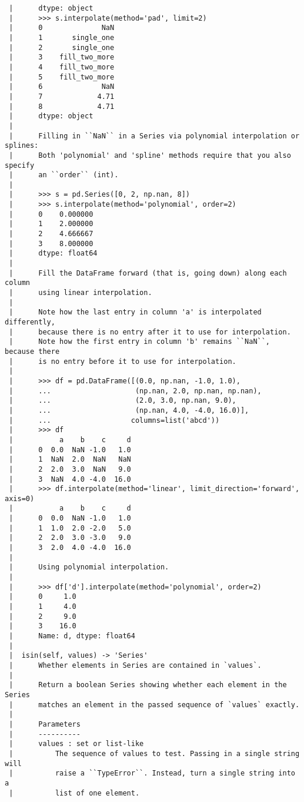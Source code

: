 \documentclass[
  letterpaper,
  DIV=11,
  numbers=noendperiod]{scrreprt}
\begin{document}
\begin{verbatim}
 |      dtype: object
 |      >>> s.interpolate(method='pad', limit=2)
 |      0              NaN
 |      1       single_one
 |      2       single_one
 |      3    fill_two_more
 |      4    fill_two_more
 |      5    fill_two_more
 |      6              NaN
 |      7             4.71
 |      8             4.71
 |      dtype: object
 |      
 |      Filling in ``NaN`` in a Series via polynomial interpolation or splines:
 |      Both 'polynomial' and 'spline' methods require that you also specify
 |      an ``order`` (int).
 |      
 |      >>> s = pd.Series([0, 2, np.nan, 8])
 |      >>> s.interpolate(method='polynomial', order=2)
 |      0    0.000000
 |      1    2.000000
 |      2    4.666667
 |      3    8.000000
 |      dtype: float64
 |      
 |      Fill the DataFrame forward (that is, going down) along each column
 |      using linear interpolation.
 |      
 |      Note how the last entry in column 'a' is interpolated differently,
 |      because there is no entry after it to use for interpolation.
 |      Note how the first entry in column 'b' remains ``NaN``, because there
 |      is no entry before it to use for interpolation.
 |      
 |      >>> df = pd.DataFrame([(0.0, np.nan, -1.0, 1.0),
 |      ...                    (np.nan, 2.0, np.nan, np.nan),
 |      ...                    (2.0, 3.0, np.nan, 9.0),
 |      ...                    (np.nan, 4.0, -4.0, 16.0)],
 |      ...                   columns=list('abcd'))
 |      >>> df
 |           a    b    c     d
 |      0  0.0  NaN -1.0   1.0
 |      1  NaN  2.0  NaN   NaN
 |      2  2.0  3.0  NaN   9.0
 |      3  NaN  4.0 -4.0  16.0
 |      >>> df.interpolate(method='linear', limit_direction='forward', axis=0)
 |           a    b    c     d
 |      0  0.0  NaN -1.0   1.0
 |      1  1.0  2.0 -2.0   5.0
 |      2  2.0  3.0 -3.0   9.0
 |      3  2.0  4.0 -4.0  16.0
 |      
 |      Using polynomial interpolation.
 |      
 |      >>> df['d'].interpolate(method='polynomial', order=2)
 |      0     1.0
 |      1     4.0
 |      2     9.0
 |      3    16.0
 |      Name: d, dtype: float64
 |  
 |  isin(self, values) -> 'Series'
 |      Whether elements in Series are contained in `values`.
 |      
 |      Return a boolean Series showing whether each element in the Series
 |      matches an element in the passed sequence of `values` exactly.
 |      
 |      Parameters
 |      ----------
 |      values : set or list-like
 |          The sequence of values to test. Passing in a single string will
 |          raise a ``TypeError``. Instead, turn a single string into a
 |          list of one element.

\end{verbatim}
\end{document}
